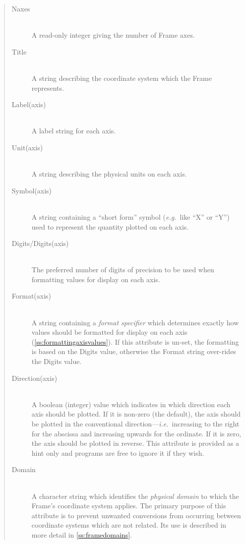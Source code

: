 \documentclass[twoside,11pt]{article}
\newcommand{\htmlref}[2]{#1}
\newcommand{\secref}[1]{\S\ref{#1}}
\renewcommand{\secref}[1]{\ref{#1}}
\begin{document}
\begin{quote}
\begin{description}
\item[\htmlref{Naxes}{Naxes}]\mbox{}\\
A read-only integer giving the number of Frame axes.

\item[\htmlref{Title}{Title}]\mbox{}\\
A string describing the coordinate system which the Frame represents.

\item[\htmlref{Label(axis)}{Labelaxis}]\mbox{}\\
A label string for each axis.

\item[\htmlref{Unit(axis)}{Unitaxis}]\mbox{}\\
A string describing the physical units on each axis.

\item[\htmlref{Symbol(axis)}{Symbolaxis}]\mbox{}\\
A string containing a ``short form'' symbol ({\em{e.g.}}\ like ``X''
or ``Y'') used to represent the quantity plotted on each axis.

\item[\htmlref{Digits/Digits(axis)}{DigitsDigitsaxis}]\mbox{}\\
The preferred number of digits of precision to be used when formatting
values for display on each axis.

\item[\htmlref{Format(axis)}{Formataxis}]\mbox{}\\
A string containing a {\em{format specifier}} which determines exactly
how values should be formatted for display on each axis
(\secref{ss:formattingaxisvalues}). If this attribute is un-set, the
formatting is based on the Digits value, otherwise the Format string
over-rides the Digits value.

\item[\htmlref{Direction(axis)}{Directionaxis}]\mbox{}\\
A boolean (integer) value which indicates in which direction each axis
should be plotted. If it is non-zero (the default), the axis should be
plotted in the conventional direction---{\em{i.e.}}\ increasing to the
right for the abscissa and increasing upwards for the ordinate. If it
is zero, the axis should be plotted in reverse.  This attribute is
provided as a hint only and programs are free to ignore it if they
wish.

\item[\htmlref{Domain}{Domain}]\mbox{}\\
A character string which identifies the {\em{physical domain}} to
which the Frame's coordinate system applies. The primary purpose of
this attribute is to prevent unwanted conversions from occurring
between coordinate systems which are not related. Its use is described
in more detail in \secref{ss:framedomains}.
\end{description}
\end{quote}
\end{document}
